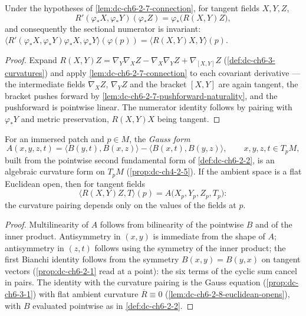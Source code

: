 \begin{lemma}
  \label{lem:dc-ch6-2-7-curvature}
  \leanok
  Under the hypotheses of \cref{lem:dc-ch6-2-7-connection}, for tangent fields
  $X,Y,Z$,
  $$
  R'(\varphi_*X,\varphi_*Y)(\varphi_*Z)=\varphi_*\bigl(R(X,Y)Z\bigr),
  $$
  and consequently the sectional numerator is invariant:
  $\langle R'(\varphi_*X,\varphi_*Y)\varphi_*X,\varphi_*Y\rangle(\varphi(p))
    =\langle R(X,Y)X,Y\rangle(p)$.
\end{lemma}
\begin{proof}
  \leanok
  \sketch
  Expand $R(X,Y)Z=\nabla_Y\nabla_XZ-\nabla_X\nabla_YZ+\nabla_{[X,Y]}Z$
  (\cref{def:dc-ch6-3-curvatures}) and apply
  \cref{lem:dc-ch6-2-7-connection} to each covariant derivative — the
  intermediate fields $\nabla_XZ$, $\nabla_YZ$ and the bracket $[X,Y]$ are
  again tangent, the bracket pushes forward by
  \cref{lem:dc-ch6-2-7-pushforward-naturality}, and the pushforward is
  pointwise linear. The numerator identity follows by pairing with
  $\varphi_*Y$ and metric preservation, $R(X,Y)X$ being tangent.
\end{proof}

\begin{lemma}
  \label{lem:dc-ch6-2-7-gauss-form}
  \leanok
  For an immersed patch and $p\in M$, the \emph{Gauss form}
  $$
  A(x,y,z,t)=\langle B(y,t),B(x,z)\rangle-\langle B(x,t),B(y,z)\rangle,
  \qquad x,y,z,t\in T_pM,
  $$
  built from the pointwise second fundamental form of \cref{def:dc-ch6-2-2},
  is an algebraic curvature form on $T_pM$ (\cref{prop:dc-ch4-2-5}). If the
  ambient space is a flat Euclidean open, then for tangent fields
  $$
  \langle R(X,Y)Z,T\rangle(p)=A\bigl(X_p,Y_p,Z_p,T_p\bigr):
  $$
  the curvature pairing depends only on the values of the fields at $p$.
\end{lemma}
\begin{proof}
  \leanok
  \sketch
  Multilinearity of $A$ follows from bilinearity of the pointwise $B$ and of
  the inner product. Antisymmetry in $(x,y)$ is immediate from the shape of
  $A$; antisymmetry in $(z,t)$ follows using the symmetry of the inner
  product; the first Bianchi identity follows from the symmetry
  $B(x,y)=B(y,x)$ on tangent vectors (\cref{prop:dc-ch6-2-1} read at a
  point): the six terms of the cyclic sum cancel in pairs. The identity with
  the curvature pairing is the Gauss equation (\cref{prop:dc-ch6-3-1}) with
  flat ambient curvature $\overline{R}\equiv 0$
  (\cref{lem:dc-ch6-2-8-euclidean-opens}), with $B$ evaluated pointwise as in
  \cref{def:dc-ch6-2-2}.
\end{proof}

